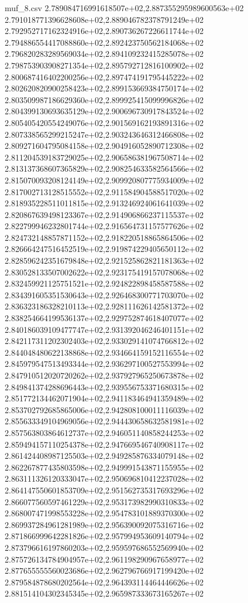 \begin{filecontents*}{muf_8.csv}
2.789084716991618507e+02,2.887355295989600563e+02
2.791018771396628608e+02,2.889046782378791249e+02
2.792952717162324916e+02,2.890736267226611744e+02
2.794886554417088860e+02,2.892423750562184068e+02
2.796820283289569034e+02,2.894109232415285078e+02
2.798753903908271354e+02,2.895792712816100902e+02
2.800687416402200256e+02,2.897474191795445222e+02
2.802620820900258423e+02,2.899153669384750174e+02
2.803509987186629360e+02,2.899925415099996826e+02
2.804399130693635129e+02,2.900696730917843524e+02
2.805405420554249076e+02,2.901569162193891316e+02
2.807338565299215247e+02,2.903243646312466808e+02
2.809271604795084158e+02,2.904916052890712308e+02
2.811204539183729025e+02,2.906586381967508714e+02
2.813137368607365829e+02,2.908254633582564566e+02
2.815070093208124149e+02,2.909920807775934009e+02
2.817002713128515552e+02,2.911584904588517020e+02
2.818935228511011815e+02,2.913246924061641039e+02
2.820867639498123367e+02,2.914906866237115537e+02
2.822799946232801744e+02,2.916564731157577626e+02
2.824732148857871152e+02,2.918220518865864506e+02
2.826664247516452519e+02,2.919874229405650112e+02
2.828596242351679848e+02,2.921525862821181363e+02
2.830528133507002622e+02,2.923175419157078068e+02
2.832459921125751521e+02,2.924822898458587588e+02
2.834391605351530643e+02,2.926468300771703070e+02
2.836323186328210113e+02,2.928111626142581372e+02
2.838254664199536137e+02,2.929752874618407077e+02
2.840186039109477747e+02,2.931392046246401151e+02
2.842117311202302403e+02,2.933029141074766812e+02
2.844048480622138868e+02,2.934664159152116554e+02
2.845979547513493344e+02,2.936297100527553994e+02
2.847910512020720262e+02,2.937927965250673878e+02
2.849841374288696443e+02,2.939556753371680315e+02
2.851772134462071904e+02,2.941183464941359489e+02
2.853702792685865006e+02,2.942808100011116039e+02
2.855633349104969056e+02,2.944430658632581981e+02
2.857563803864612737e+02,2.946051140858244253e+02
2.859494157110254378e+02,2.947669546740908117e+02
2.861424408987125503e+02,2.949285876334079148e+02
2.862267877435803598e+02,2.949991543871155955e+02
2.863111326120333047e+02,2.950696810412237028e+02
2.864147550601853709e+02,2.951562735317693296e+02
2.866077560597461229e+02,2.953173982990310833e+02
2.868007471998553228e+02,2.954783101889370300e+02
2.869937284961281989e+02,2.956390092075316716e+02
2.871866999642281826e+02,2.957994953609140794e+02
2.873796616197860203e+02,2.959597686552569940e+02
2.875726134784904957e+02,2.961198290967658977e+02
2.877655555560023686e+02,2.962796766917199420e+02
2.879584878680202564e+02,2.964393114464446626e+02
2.881514104302345345e+02,2.965987333673165267e+02

\end{filecontents*}
